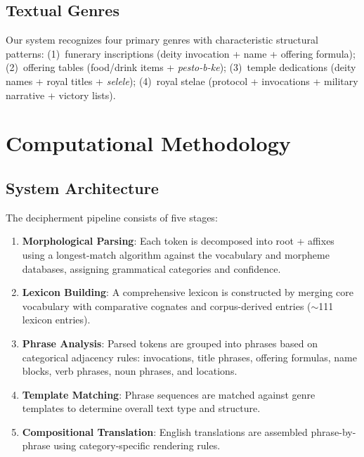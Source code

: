 \documentclass[11pt,a4paper]{article}
\begin{document}
\subsection{Textual Genres}

Our system recognizes four primary genres with characteristic structural
patterns: (1)~funerary inscriptions (deity invocation + name + offering
formula); (2)~offering tables (food/drink items + \textit{pesto-b-ke});
(3)~temple dedications (deity names + royal titles + \textit{selele});
(4)~royal stelae (protocol + invocations + military narrative + victory lists).


\section{Computational Methodology}

\subsection{System Architecture}

The decipherment pipeline consists of five stages:

\begin{enumerate}
  \item \textbf{Morphological Parsing}: Each token is decomposed into root +
        affixes using a longest-match algorithm against the vocabulary and
        morpheme databases, assigning grammatical categories and confidence.

  \item \textbf{Lexicon Building}: A comprehensive lexicon is constructed by
        merging core vocabulary with comparative cognates and corpus-derived
        entries ($\sim$111 lexicon entries).

  \item \textbf{Phrase Analysis}: Parsed tokens are grouped into phrases based
        on categorical adjacency rules: invocations, title phrases, offering
        formulas, name blocks, verb phrases, noun phrases, and locations.

  \item \textbf{Template Matching}: Phrase sequences are matched against genre
        templates to determine overall text type and structure.

  \item \textbf{Compositional Translation}: English translations are assembled
        phrase-by-phrase using category-specific rendering rules.
\end{enumerate}
\end{document}
